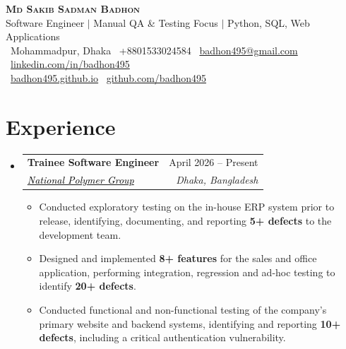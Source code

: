 \documentclass[a4paper]{article}
\makeatletter
\newcommand{\resumeItem}[1]{
  \item\small{
    {#1 \vspace{-2pt}}
  }
}
\newcommand{\resumeSubheading}[4]{
  \vspace{-2pt}\item
    \begin{tabular*}{0.97\textwidth}[t]{l@{\extracolsep{\fill}}r}
      \textbf{#1} & #2 \\
      \textit{\small#3} & \textit{\small #4} \\
    \end{tabular*}\vspace{-7pt}
}
\newcommand{\resumeSubHeadingListStart}{\begin{itemize}[leftmargin=0.15in, label={}]}
\newcommand{\resumeSubHeadingListEnd}{\end{itemize}}
\newcommand{\resumeItemListStart}{\begin{itemize}}
\newcommand{\resumeItemListEnd}{\end{itemize}\vspace{-5pt}}
\makeatother
\begin{document}
\begin{center}
    \textbf{\Huge \scshape Md Sakib Sadman Badhon} \\ \vspace{4pt}
    \small Software Engineer $|$ Manual QA \& Testing Focus $|$ Python, SQL, Web Applications \\ \vspace{4pt}
    \small
    \faMapMarker*~Mohammadpur, Dhaka \enspace
    ~+8801533024584 \enspace
    \faEnvelope~\href{mailto:badhon495@gmail.com}{badhon495@gmail.com} \enspace
    \faLinkedin~\href{https://linkedin.com/in/badhon495/}{linkedin.com/in/badhon495} \\ \vspace{4pt}
    \faGlobe~\href{https://badhon495.github.io/}{badhon495.github.io} \enspace
    \faGithub~\href{https://github.com/badhon495}{github.com/badhon495} \enspace
\end{center}




\section{Experience}
  \resumeSubHeadingListStart

    \resumeSubheading
      {Trainee Software Engineer}{April 2026 -- Present}
      {\href{https://www.nationalpolymer.net/}{\textcolor{black}{National Polymer Group}}}{Dhaka, Bangladesh}
      \resumeItemListStart
        \resumeItem{Conducted exploratory testing on the in-house ERP system prior to release, identifying, documenting, and reporting \textbf{5+ defects} to the development team.}
        \resumeItem{Designed and implemented \textbf{8+ features} for the sales and office application, performing integration, regression and ad-hoc testing to identify \textbf{20+ defects}.}
  \resumeItem{Conducted functional and non-functional testing of the company's primary website and backend systems, identifying and reporting \textbf{10+ defects}, including a critical authentication vulnerability.}
      \resumeItemListEnd

  \resumeSubHeadingListEnd




\end{document}
